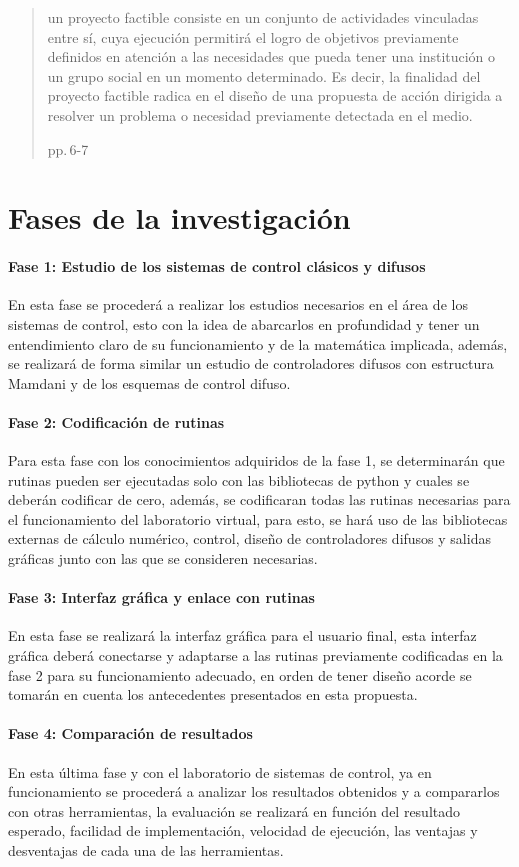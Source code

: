 	\blockquote[pp.$\,$6-7]{un proyecto factible consiste en un conjunto de actividades vinculadas entre sí, cuya ejecución permitirá el logro de objetivos previamente definidos en atención a las necesidades que pueda tener una institución o un grupo social en un momento determinado. Es decir, la finalidad del proyecto factible radica en el diseño de una propuesta de acción dirigida a resolver un problema o necesidad previamente detectada en el medio.}

\section{Fases de la investigación}
	
	\paragraph{Fase 1: Estudio de los sistemas de control clásicos y difusos}
		
		En esta fase se procederá a realizar los estudios necesarios en el área de los sistemas de control, esto con la idea de abarcarlos en profundidad y tener un entendimiento claro de su funcionamiento y de la matemática implicada, además, se realizará de forma similar un estudio de controladores difusos con estructura Mamdani y de los esquemas de control difuso.
		
	\paragraph{Fase 2: Codificación de rutinas}
		
		Para esta fase con los conocimientos adquiridos de la fase 1, se determinarán que rutinas pueden ser ejecutadas solo con las bibliotecas de python y cuales se deberán codificar de cero, además, se codificaran todas las rutinas necesarias para el funcionamiento del laboratorio virtual, para esto, se hará uso de las bibliotecas externas de cálculo numérico, control, diseño de controladores difusos y salidas gráficas junto con las que se consideren necesarias.
		
	\paragraph{Fase 3: Interfaz gráfica y enlace con rutinas}
		
		En esta fase se realizará la interfaz gráfica para el usuario final, esta interfaz gráfica deberá conectarse y adaptarse a las rutinas previamente codificadas en la fase 2 para su funcionamiento adecuado, en orden de tener diseño acorde se tomarán en cuenta los antecedentes presentados en esta propuesta.
		
	\paragraph{Fase 4: Comparación de resultados}
		
		En esta última fase y con el laboratorio de sistemas de control, ya en funcionamiento se procederá a analizar los resultados obtenidos y a compararlos con otras herramientas, la evaluación se realizará en función del resultado esperado, facilidad de implementación, velocidad de ejecución, las ventajas y desventajas de cada una de las herramientas.
